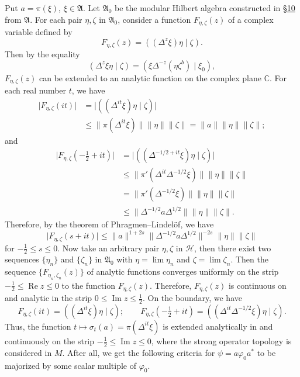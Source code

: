 \documentclass[12pt,b5paper,twoside]{article}
\theoremstyle{takesaki}
\numberwithin{equation}{section}
\begin{document}
Put $a=\pi(\xi)$, $\xi\in\mathfrak A$.  Let $\mathfrak A_0$ be the
modular Hilbert algebra constructed in \hyperref[sec:10]{\S10} from
$\mathfrak A$.  For each pair $\eta,\zeta$ in $\mathfrak A_0$, consider
a function $F_{\eta,\zeta}(z)$ of a complex variable defined by
\[
  F_{\eta,\zeta}(z)=((\Delta^z\xi)\eta\mid\zeta).
\]
Then by the equality
\[
  (\Delta^z\xi\eta\mid\zeta)
  =(\xi\Delta^{-z}(\eta\zeta^b)\mid\xi_0),
\]
$F_{\eta,\zeta}(z)$ can be extended to an analytic function on the
complex plane $\mathbb C$.  For each real number $t$, we have
\begin{align*}
  \lvert F_{\eta,\zeta}(it)\rvert
    &=\lvert((\Delta^{it}\xi)\eta\mid\zeta)\rvert\\
    &\leq\lVert\pi(\Delta^{it}\xi)\rVert
      \lVert\eta\rVert\lVert\zeta\rVert
     =\lVert a\rVert\lVert\eta\rVert\lVert\zeta\rVert;
\end{align*}
and
\begin{align*}
  \lvert F_{\eta,\zeta}(-\tfrac12+it)\rvert
    &=\lvert((\Delta^{-1/2+it}\xi)\eta\mid\zeta)\rvert\\
    &\leq\lVert\pi'(\Delta^{it}\Delta^{-1/2}\xi)\rVert
      \lVert\eta\rVert\lVert\zeta\rVert\\
    &=\lVert\pi'(\Delta^{-1/2}\xi)\rVert
      \lVert\eta\rVert\lVert\zeta\rVert\\
    &\leq\lVert\Delta^{-1/2}a\Delta^{1/2}\rVert
      \lVert\eta\rVert\lVert\zeta\rVert.
\end{align*}
Therefore, by the theorem of Phragmen--Lindel\"of, we have
\[
  \lvert F_{\eta,\zeta}(s+it)\rvert
  \leq\lVert a\rVert^{1+2s}
       \lVert\Delta^{-1/2}a\Delta^{1/2}\rVert^{-2s}
       \lVert\eta\rVert\lVert\zeta\rVert
\]
for $-\tfrac12\leq s\leq0$.  Now take an arbitrary pair $\eta,\zeta$
in $\mathcal H$, then there exist two sequences $\{\eta_n\}$ and
$\{\zeta_n\}$ in $\mathfrak A_0$ with
$\eta=\lim\eta_n$ and $\zeta=\lim\zeta_n$.  Then the sequence
$\{F_{\eta_n,\zeta_n}(z)\}$ of analytic functions converges uniformly on
the strip $-\tfrac12\leq\operatorname{Re}z\leq0$ to the function
$F_{\eta,\zeta}(z)$.  Therefore, $F_{\eta,\zeta}(z)$ is continuous on and
analytic in the strip $0\leq\operatorname{Im}z\leq\tfrac12$.  On the
boundary, we have
\[
  F_{\eta,\zeta}(it)=((\Delta^{it}\xi)\eta\mid\zeta);
  \qquad
  F_{\eta,\zeta}(-\tfrac12+it)
   =((\Delta^{it}\Delta^{-1/2}\xi)\eta\mid\zeta).
\]
Thus, the function $t\mapsto\sigma_t(a)=\pi(\Delta^{it}\xi)$ is extended
analytically in and continuously on the strip
$-\tfrac12\leq\operatorname{Im}z\leq0$, where the strong operator
topology is considered in $M$.  After all, we get the following criteria
for $\psi=a\varphi_0a^*$ to be majorized by some scalar multiple of
$\varphi_0$.
\end{document}
